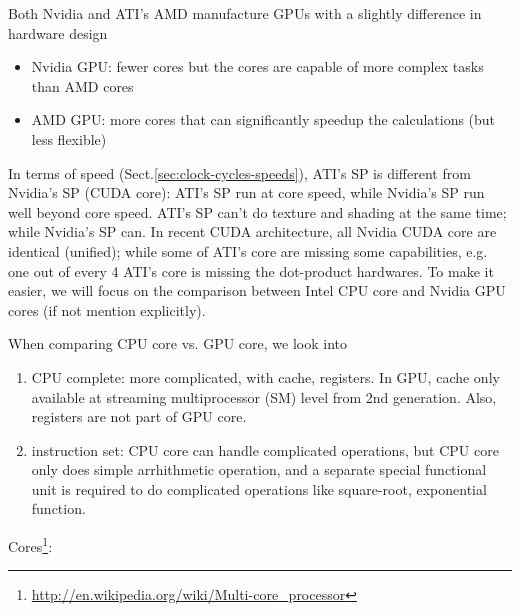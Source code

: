   
Both Nvidia and ATI's AMD manufacture GPUs with a slightly difference in
hardware design
\begin{itemize}
  \item Nvidia GPU: fewer cores but the cores are capable of more complex tasks
  than AMD cores
  
  \item AMD GPU: more cores that can significantly speedup the calculations
  (but less flexible)
\end{itemize}


In terms of speed (Sect.\ref{sec:clock-cycles-speeds}),  ATI's SP is different
from Nvidia's SP (CUDA core): ATI's SP run at core speed, while Nvidia's SP  run
well beyond core speed. ATI's SP can't do texture and shading at the same time;
while Nvidia's SP can. In recent CUDA architecture, all Nvidia CUDA core are
identical (unified); while some of ATI's core are missing some capabilities,
e.g. one out of every 4 ATI's core is missing the dot-product hardwares. To make
it easier, we will focus on the comparison between Intel CPU core and Nvidia GPU
cores (if not mention explicitly).
  
\begin{framed}
  When comparing CPU core vs. GPU core, we look into 
  \begin{enumerate}
    \item CPU complete: more complicated, with cache, registers. In GPU,
    cache only available at streaming multiprocessor (SM) level from 2nd
    generation. Also, registers are not part of GPU core.
    \item instruction set: CPU core can handle complicated operations, but CPU
    core only does simple arrhithmetic operation, and a separate special
    functional unit is required to do complicated operations like square-root,
    exponential function.
  \end{enumerate}
\end{framed}
  
Cores\footnote{\url{http://en.wikipedia.org/wiki/Multi-core_processor}}:
 
